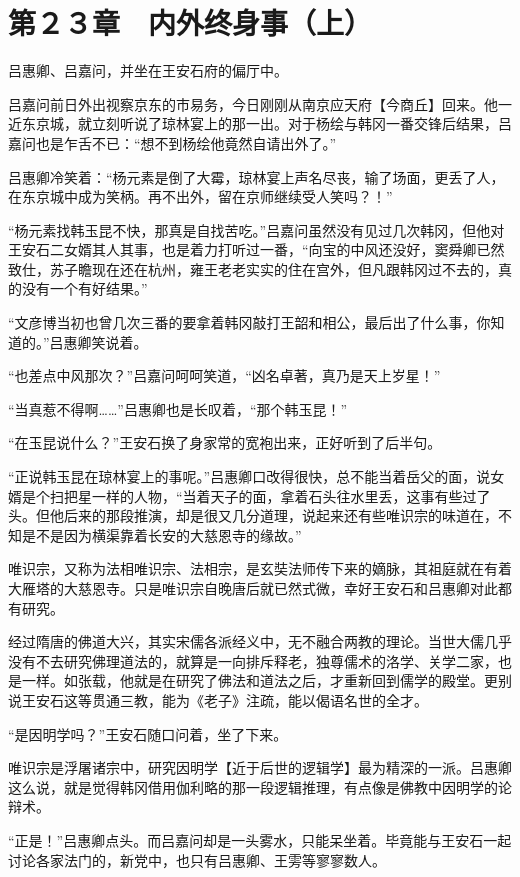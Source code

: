 \section{第２３章　内外终身事（上）}

吕惠卿、吕嘉问，并坐在王安石府的偏厅中。

吕嘉问前日外出视察京东的市易务，今日刚刚从南京应天府【今商丘】回来。他一近东京城，就立刻听说了琼林宴上的那一出。对于杨绘与韩冈一番交锋后结果，吕嘉问也是乍舌不已：“想不到杨绘他竟然自请出外了。”

吕惠卿冷笑着：“杨元素是倒了大霉，琼林宴上声名尽丧，输了场面，更丢了人，在东京城中成为笑柄。再不出外，留在京师继续受人笑吗？！”

“杨元素找韩玉昆不快，那真是自找苦吃。”吕嘉问虽然没有见过几次韩冈，但他对王安石二女婿其人其事，也是着力打听过一番，“向宝的中风还没好，窦舜卿已然致仕，苏子瞻现在还在杭州，雍王老老实实的住在宫外，但凡跟韩冈过不去的，真的没有一个有好结果。”

“文彦博当初也曾几次三番的要拿着韩冈敲打王韶和相公，最后出了什么事，你知道的。”吕惠卿笑说着。

“也差点中风那次？”吕嘉问呵呵笑道，“凶名卓著，真乃是天上岁星！”

“当真惹不得啊……”吕惠卿也是长叹着，“那个韩玉昆！”

“在玉昆说什么？”王安石换了身家常的宽袍出来，正好听到了后半句。

“正说韩玉昆在琼林宴上的事呢。”吕惠卿口改得很快，总不能当着岳父的面，说女婿是个扫把星一样的人物，“当着天子的面，拿着石头往水里丢，这事有些过了头。但他后来的那段推演，却是很又几分道理，说起来还有些唯识宗的味道在，不知是不是因为横渠靠着长安的大慈恩寺的缘故。”

唯识宗，又称为法相唯识宗、法相宗，是玄奘法师传下来的嫡脉，其祖庭就在有着大雁塔的大慈恩寺。只是唯识宗自晚唐后就已然式微，幸好王安石和吕惠卿对此都有研究。

经过隋唐的佛道大兴，其实宋儒各派经义中，无不融合两教的理论。当世大儒几乎没有不去研究佛理道法的，就算是一向排斥释老，独尊儒术的洛学、关学二家，也是一样。如张载，他就是在研究了佛法和道法之后，才重新回到儒学的殿堂。更别说王安石这等贯通三教，能为《老子》注疏，能以偈语名世的全才。

“是因明学吗？”王安石随口问着，坐了下来。

唯识宗是浮屠诸宗中，研究因明学【近于后世的逻辑学】最为精深的一派。吕惠卿这么说，就是觉得韩冈借用伽利略的那一段逻辑推理，有点像是佛教中因明学的论辩术。

“正是！”吕惠卿点头。而吕嘉问却是一头雾水，只能呆坐着。毕竟能与王安石一起讨论各家法门的，新党中，也只有吕惠卿、王雱等寥寥数人。

